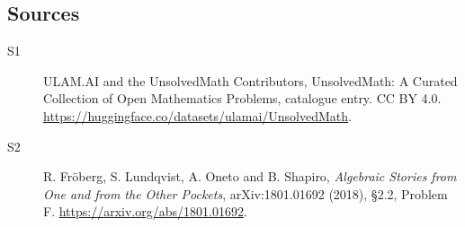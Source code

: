 \documentclass[11pt]{article}
\begin{document}
\subsection{Sources}
\begin{description}
\item[\hypertarget{source:statement:1}{S1}] ULAM.AI and the UnsolvedMath Contributors, UnsolvedMath: A Curated Collection of Open Mathematics Problems, catalogue entry. CC BY 4.0. \url{https://huggingface.co/datasets/ulamai/UnsolvedMath}.
\item[\hypertarget{source:statement:2}{S2}] R. Fröberg, S. Lundqvist, A. Oneto and B. Shapiro, \emph{Algebraic Stories from One and from the Other Pockets}, arXiv:1801.01692 (2018), §2.2, Problem F. \url{https://arxiv.org/abs/1801.01692}.
\end{description}
\label{end:statement}
\end{document}
